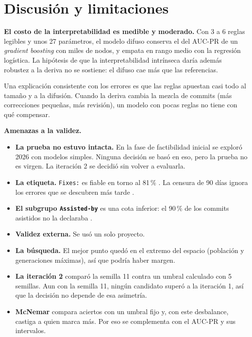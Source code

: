 \section{Discusión y limitaciones}

\textbf{El costo de la interpretabilidad es medible y moderado.} Con 3 a 6 reglas legibles y unos 27 parámetros, el modelo difuso conserva el \cifCuno{} del AUC-PR de un \emph{gradient boosting} con miles de nodos, y empata en rango medio con la regresión logística. La hipótesis de que la interpretabilidad intrínseca daría además robustez a la deriva no se sostiene: el difuso cae más que las referencias.

Una explicación consistente con los errores es que las reglas apuestan casi todo al tamaño y a la difusión. Cuando la deriva cambia la mezcla de commits (más correcciones pequeñas, más revisión), un modelo con pocas reglas no tiene con qué compensar.

\textbf{Amenazas a la validez.}
\begin{itemize}
\item \textbf{La prueba no estuvo intacta.} En la fase de factibilidad inicial se exploró 2026 con modelos simples. Ninguna decisión se basó en eso, pero la prueba no es virgen. La iteración 2 se decidió sin volver a evaluarla.
\item \textbf{La etiqueta.} \texttt{Fixes:} es fiable en torno al 81\,\% \cite{Lyu2024}. La censura de 90 días ignora los errores que se descubren más tarde \cite{Falessi2022}.
\item \textbf{El subgrupo \texttt{Assisted-by}} es una cota inferior: el 90\,\% de los commits asistidos no la declaraba \cite{KernelRemove}.
\item \textbf{Validez externa.} Se usó un solo proyecto.
\item \textbf{La búsqueda.} El mejor punto quedó en el extremo del espacio (población y generaciones máximas), así que podría haber margen.
\item \textbf{La iteración 2} comparó la semilla 11 contra un umbral calculado con 5 semillas. Aun con la semilla 11, ningún candidato superó a la iteración 1, así que la decisión no depende de esa asimetría.
\item \textbf{McNemar} compara aciertos con un umbral fijo y, con este desbalance, castiga a quien marca más. Por eso se complementa con el AUC-PR y sus intervalos.
\end{itemize}

